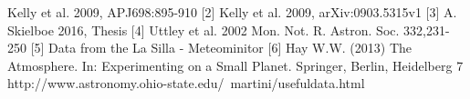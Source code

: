 \documentclass[a4paper, 12pt, twoside]{article}
\begin{document}








\newpage
[1] Kelly et al. 2009, APJ698:895-910 
[2] Kelly et al. 2009, arXiv:0903.5315v1 
[3] A. Skielboe 2016, Thesis 
[4] Uttley et al. 2002 Mon. Not. R. Astron. Soc. 332,231-250
[5] Data from the La Silla - Meteominitor
[6] Hay W.W. (2013) The Atmosphere. In: Experimenting on a Small Planet. Springer, Berlin, Heidelberg
{7} http://www.astronomy.ohio-state.edu/~martini/usefuldata.html

\end{document}
